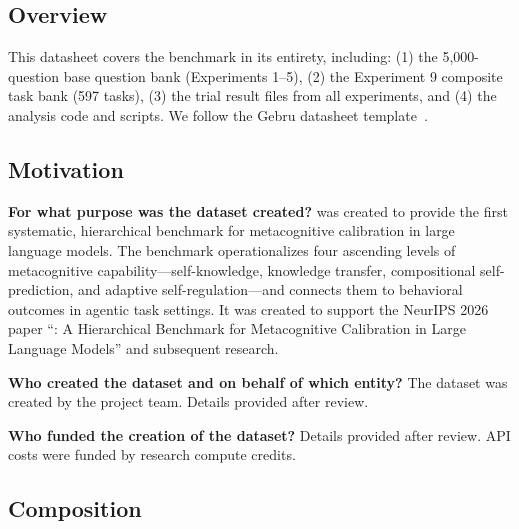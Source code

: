 
\subsection*{Overview}

This datasheet covers the \mirror{} benchmark in its entirety, including: (1) the
5,000-question base question bank (Experiments 1--5), (2) the Experiment 9 composite
task bank (597 tasks), (3) the trial result files from all experiments, and (4) the
analysis code and scripts. We follow the Gebru \etal{} datasheet template~\citep{gebru2021datasheets}.

\subsection*{Motivation}

\textbf{For what purpose was the dataset created?}
\mirror{} was created to provide the first systematic, hierarchical benchmark for
metacognitive calibration in large language models. The benchmark operationalizes
four ascending levels of metacognitive capability---self-knowledge, knowledge transfer,
compositional self-prediction, and adaptive self-regulation---and connects them to
behavioral outcomes in agentic task settings. It was created to support the NeurIPS
2026 paper ``\mirror{}: A Hierarchical Benchmark for Metacognitive Calibration in
Large Language Models'' and subsequent research.

\textbf{Who created the dataset and on behalf of which entity?}
The dataset was created by the \mirror{} project team. Details provided after review.

\textbf{Who funded the creation of the dataset?}
Details provided after review. API costs were funded by research compute credits.

\subsection*{Composition}

